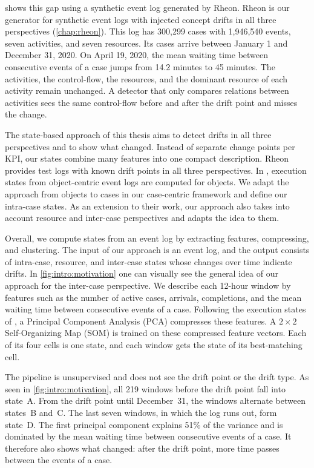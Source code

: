  shows this gap using a synthetic event log generated by Rheon. Rheon is our generator for synthetic event logs with injected concept drifts in all three perspectives (\cref{chap:rheon}). This log has 300,299 cases with 1,946,540 events, seven activities, and seven resources. Its cases arrive between January 1 and December 31, 2020. On April 19, 2020, the mean waiting time between consecutive events of a case jumps from 14.2 minutes to 45 minutes. The activities, the control-flow, the resources, and the dominant resource of each activity remain unchanged. A detector that only compares relations between activities sees the same control-flow before and after the drift point and misses the change.

The state-based approach of this thesis aims to detect drifts in all three perspectives and to show what changed. Instead of separate change points per KPI, our states combine many features into one compact description. Rheon provides test logs with known drift points in all three perspectives. In \textcite{berti2025ocel}, execution states from object-centric event logs are computed for objects. We adapt the approach from objects to cases in our case-centric framework and define our intra-case states. As an extension to their work, our approach also takes into account resource and inter-case perspectives and adapts the idea to them.

Overall, we compute states from an event log by extracting features, compressing, and clustering. The input of our approach is an event log, and the output consists of intra-case, resource, and inter-case states whose changes over time indicate drifts. In \cref{fig:intro:motivation} one can visually see the general idea of our approach for the inter-case perspective. We describe each 12-hour window by features such as the number of active cases, arrivals, completions, and the mean waiting time between consecutive events of a case. Following the execution states of \citeauthor{berti2025ocel}, a Principal Component Analysis (PCA) compresses these features. A $2 \times 2$ Self-Organizing Map (SOM) is trained on these compressed feature vectors. Each of its four cells is one state, and each window gets the state of its best-matching cell.

The pipeline is unsupervised and does not see the drift point or the drift type. As seen in \cref{fig:intro:motivation}, all 219 windows before the drift point fall into state~A. From the drift point until December~31, the windows alternate between states~B and~C. The last seven windows, in which the log runs out, form state~D. The first principal component explains 51\% of the variance and is dominated by the mean waiting time between consecutive events of a case. It therefore also shows what changed: after the drift point, more time passes between the events of a case.

